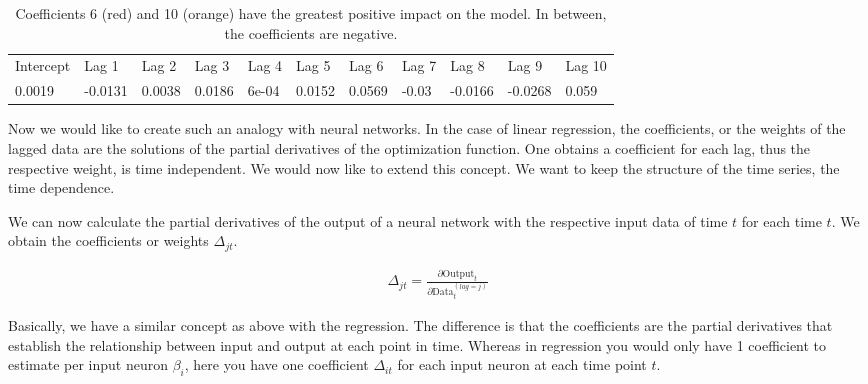 \documentclass[
]{article}
\begin{document}
\begin{table}[!h]

\caption{\label{tab:lm_tab}Coefficients 6 (red) and 10 (orange) have the greatest positive impact on the model. In between, the coefficients are negative.}
\centering
\begin{tabular}[t]{>{}l>{}l>{}l>{}l>{}l>{}l>{}l>{}l>{}l>{}l>{}l}
\toprule
\textcolor[HTML]{000000}{Intercept} & \textcolor[HTML]{000000}{Lag 1} & \textcolor[HTML]{000000}{Lag 2} & \textcolor[HTML]{000000}{Lag 3} & \textcolor[HTML]{000000}{Lag 4} & \textcolor[HTML]{000000}{Lag 5} & \textcolor[HTML]{f6004a}{Lag 6} & \textcolor[HTML]{004c6d}{Lag 7} & \textcolor[HTML]{0075b6}{Lag 8} & \textcolor[HTML]{665191}{Lag 9} & \textcolor[HTML]{ff7c43}{Lag 10}\\
\textcolor[HTML]{000000}{0.0019} & \textcolor[HTML]{000000}{-0.0131} & \textcolor[HTML]{000000}{0.0038} & \textcolor[HTML]{000000}{0.0186} & \textcolor[HTML]{000000}{6e-04} & \textcolor[HTML]{000000}{0.0152} & \textcolor[HTML]{f6004a}{0.0569} & \textcolor[HTML]{004c6d}{-0.03} & \textcolor[HTML]{0075b6}{-0.0166} & \textcolor[HTML]{665191}{-0.0268} & \textcolor[HTML]{ff7c43}{0.059}\\
\bottomrule
\end{tabular}
\end{table}

Now we would like to create such an analogy with neural networks. In the
case of linear regression, the coefficients, or the weights of the
lagged data are the solutions of the partial derivatives of the
optimization function. One obtains a coefficient for each lag, thus the
respective weight, is time independent. We would now like to extend this
concept. We want to keep the structure of the time series, the time
dependence.

We can now calculate the partial derivatives of the output of a neural
network with the respective input data of time \(t\) for each time
\(t\). We obtain the coefficients or weights \(\Delta_{jt}\).

\begin{align} \label{eq:xai_partial}
\Delta_{jt} = \frac{\partial \text{Output}_{t}}{\partial \text{Data}^{(lag=j)}_{t}}
\end{align}  

Basically, we have a similar concept as above with the regression. The
difference is that the coefficients are the partial derivatives that
establish the relationship between input and output at each point in
time. Whereas in regression you would only have 1 coefficient to
estimate per input neuron \(\beta_{i}\), here you have one coefficient
\(\Delta_{it}\) for each input neuron at each time point \(t\).
\end{document}
